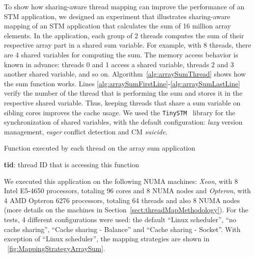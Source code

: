To show how  sharing-aware thread mapping can improve the performance of an STM application, we designed an experiment that illustrates sharing-aware mapping of an STM application that calculates the sum of 16 million array elements. In the application, each group of 2 threads computes the sum of their respective array part in a shared sum variable. For example, with 8 threads, there are 4 shared variables for computing the sum.  The memory access behavior is known in advance: threads 0 and 1 access a shared variable, threads 2 and 3 another shared variable, and so on. Algorithm~\ref{alg:arraySumThread} shows how the sum function works. Lines \ref{alg:arraySumFirstLine}-\ref{alg:arraySumLastLine} verify the number
of the thread that is performing the sum and stores it in the respective shared variable. Thus, keeping threads that share a sum variable on sibling cores improves the cache usage. We used the \texttt{TinySTM}~\cite{TinySTM2} library for the synchronization of shared variables, with the default configuration: \emph{lazy} version management, \emph{eager} conflict detection and CM \emph{suicide}.

\begin{algorithm}[!tb]
	\caption{Function executed by each thread on the array sum application}\label{alg:arraySumThread}
	\small
	\begin{algorithmic}[1]
		\Require
		\Statex \textbf{tid}: thread ID that is accessing this function
		\Statex
		\State {} 
			\State	{}   
			    \label{alg:arraySumFirstLine}
				\State {}
				\State {}
				\State {}
				\State {} \label{alg:arraySumLastLine}
			\EndIf
			\State	{}   
		\EndFor
		\EndFunction
	\end{algorithmic}
\end{algorithm}

We executed this application on the following NUMA machines: \textit{Xeon}, with 8 Intel E5-4650 processors, totaling 96 cores and 8 NUMA nodes and \textit{Opteron}, with 4 AMD Opteron 6276 processors, totaling 64 threads and also 8 NUMA nodes (more details on the machines in Section~\ref{sect:threadMapMethodology}). For the tests, 4 different configurations were used: the default ``Linux scheduler'', ``no cache sharing'', ``Cache sharing - Balance'' and ``Cache sharing - Socket''. With exception of ``Linux scheduler'', the mapping strategies are shown in \figurename~\ref{fig:MappingStrategyArraySum}.

